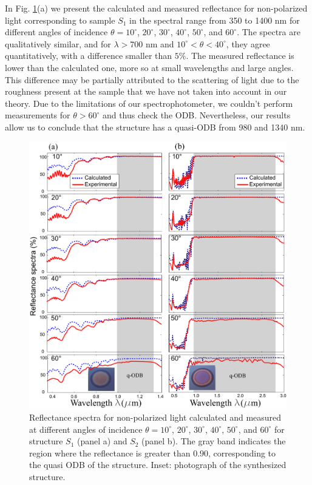 \documentclass[a4paper,fleqn]{cas-sc}
\begin{document}
In Fig. \ref{Fig2}(a) we present the calculated and measured
reflectance for non-polarized light corresponding to sample $S_1$ in the spectral range from 350 to 1400
nm for different angles of
incidence $\theta=10^\circ$, $20^\circ$, $30^\circ$, $40^\circ$,
$50^\circ$, and $60^\circ$. The spectra are qualitatively
similar, and for $\lambda>700$ nm and $10^\circ < \theta <
40^\circ$, they agree quantitatively, with a difference smaller
than $5\%$.
The
measured reflectance is lower than the calculated one, more so at
small wavelengths and large angles. This difference
may be partially attributed to the scattering of light due to the
roughness present at the sample
\cite{Theiss1994,Chavez2020,Ortiz2020} that we have not taken into
account in our theory. Due to the limitations of our
spectrophotometer, we couldn't perform measurements for $\theta>60^\circ$ and thus
check the ODB. Nevertheless, our results allow us to conclude that
the structure has a quasi-ODB from 980 and
1340 nm.
\begin{figure}
  \begin{center}
    \includegraphics[width=\textwidth]{F2Alternativa.pdf}
  \end{center}
  \caption{Reflectance spectra for non-polarized light calculated and measured at different
    angles of incidence $\theta=10^\circ$, $20^\circ$, $30^\circ$,
    $40^\circ$, $50^\circ$, and $60^\circ$ for structure $S_1$
    (panel a)  and $S_2$ (panel b). The gray band indicates the
    region where the reflectance is greater than  $0.90$,
    corresponding to the quasi ODB of the
    structure. Inset: photograph of the synthesized structure.}
  \label{Fig2}
\end{figure}
\end{document}

